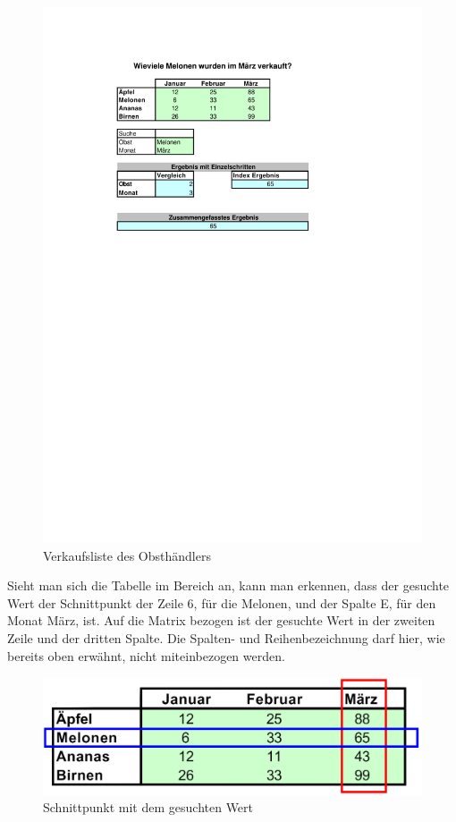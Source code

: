 	\begin{figure}[H]
		\centering
			\includegraphics[scale=0.7]{images/Index_Grundbeispiel}
		\caption{Verkaufsliste des Obsthändlers}
		\label{fig:index_grundbeispiel}
	\end{figure}

Sieht man sich die Tabelle im Bereich  an, kann man erkennen, dass der gesuchte Wert der Schnittpunkt der Zeile 6, für die Melonen, und der Spalte E, für den Monat März, ist. Auf die Matrix bezogen ist der gesuchte Wert in der zweiten Zeile und der dritten Spalte. Die Spalten- und Reihenbezeichnung darf hier, wie bereits oben erwähnt, nicht miteinbezogen werden.


	\begin{figure}[H]
		\centering
			\includegraphics[scale=0.7]{images/index_matrix}
		\caption{Schnittpunkt mit dem gesuchten Wert}
		\label{fig:index_matrix}
	\end{figure}

